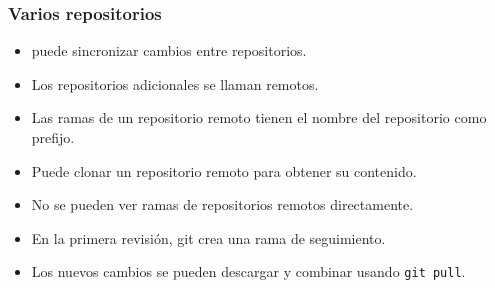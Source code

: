 \begin{frame}
	\frametitle{Varios repositorios
		📡}

	\begin{itemize}
		\item
		
		 puede sincronizar cambios entre repositorios.
		
		\item
		
		Los repositorios adicionales se llaman remotos.
		
		\item
		
		Las ramas de un repositorio remoto tienen el nombre del
		      repositorio como prefijo.
		
			  \item
			  
			  Puede clonar un repositorio remoto para obtener su contenido.
		
			  \item
			  
			  No se pueden ver ramas de repositorios remotos directamente.
		
			  \item
			  
			  En la primera revisión, git crea una rama de seguimiento.
		
			  \item 
			  
			  Los nuevos cambios se pueden descargar y combinar usando
		      \lstinline|git pull|.
	\end{itemize}
\end{frame}


